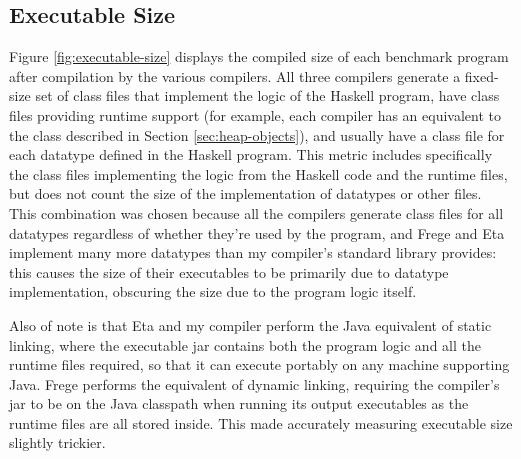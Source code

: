 \documentclass[dissertation.tex]{subfiles}
\begin{document}
{{    }
    \subsection{Executable Size}
    {


        Figure \ref{fig:executable-size} displays the compiled size of each benchmark program after compilation by the
        various compilers. All three compilers generate a fixed-size set of class files that implement the logic of the
        Haskell program, have class files providing runtime support (for example, each compiler has an equivalent to the
         class described in Section \ref{sec:heap-objects}), and usually have a class file for each
        datatype defined in the Haskell program. This metric includes specifically the class files implementing the
        logic from the Haskell code and the runtime files, but does not count the size of the implementation of
        datatypes or other files. This combination was chosen because all the compilers generate class files for all
        datatypes regardless of whether they're used by the program, and Frege and Eta implement many more datatypes
        than my compiler's standard library provides: this causes the size of their executables to be primarily due to
        datatype implementation, obscuring the size due to the program logic itself.

        Also of note is that Eta and my compiler perform the Java equivalent of static linking, where the executable jar
        contains both the program logic and all the runtime files required, so that it can execute portably on any
        machine supporting Java. Frege performs the equivalent of dynamic linking, requiring the compiler's jar to be on
        the Java classpath when running its output executables as the runtime files are all stored inside. This made
        accurately measuring executable size slightly trickier.

}}
\end{document}
